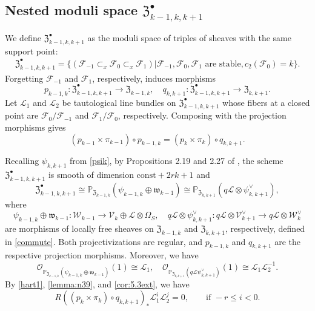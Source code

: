 \documentclass{amsart}
\numberwithin{equation}{section}
\newcommand\mc{\mathcal}
\newcommand\mf{\mathfrak}
\newcommand\mb{\mathbb}
\theoremstyle{definition}
\theoremstyle{remark}
\begin{document}
\subsection{Nested moduli space $\mf{Z}_{k-1,k,k+1}^{\bullet}$} We define $\mf{Z}_{k-1,k,k+1}^{\bullet}$ as the moduli space of triples of sheaves with the same support point:
\begin{align*}
 \mf{Z}_{k-1,k,k+1}^{\bullet}=\{(\mc{F}_{-1}\subset_{x} \mc{F}_{0}\subset_{x} \mc{F}_{1})| \mc{F}_{-1},\mc{F}_{0},\mc{F}_{1}\text{ are stable}, c_{2}(\mc{F}_{0})=k\}.
\end{align*}
Forgetting $\mc{F}_{-1}$ and $\mc{F}_{1}$, respectively, induces morphisms
$$p_{k-1,k}:\mf{Z}_{k-1,k,k+1}^{\bullet}\to \mf{Z}_{k-1,k},\quad q_{k,k+1}:\mf{Z}_{k-1,k,k+1}^{\bullet}\to \mf{Z}_{k,k+1}.$$
Let $\mathcal{L}_{1}$ and $\mathcal{L}_{2}$ be tautological line bundles on $\mf{Z}_{k-1,k,k+1}^{\bullet}$ whose fibers at a closed point are $\mathcal{F}_{0}/\mc{F}_{-1}$ and $\mathcal{F}_{1}/\mathcal{F}_{0}$, respectively. Composing with the projection morphisms gives 
\begin{equation}
  \label{hart1}
  (p_{k-1}\times \pi_{k-1})\circ p_{k-1,k}=(p_{k}\times \pi_{k})\circ q_{k,k+1}.
\end{equation}

Recalling $\psi_{k,k+1}$ from \cref{psik}, by Propositions 2.19 and 2.27 of \cite{neguct2018hecke},
 the scheme $\mf{Z}_{k-1,k,k+1}^{\bullet}$ is smooth of dimension $\mathrm{const}+2rk+1$ and
\begin{equation}
   \label{lemma:n39}
    \mf{Z}_{k-1,k,k+1}^{\bullet}\cong \mb{P}_{\mf{Z}_{k-1,k}}(\psi_{k-1,k}\oplus \mf{w}_{k-1})\cong \mb{P}_{\mf{Z}_{k,k+1}}(q\mc{L}\otimes \psi_{k,k+1}^{\vee}),
\end{equation}
where
  $$\psi_{k-1,k}\oplus \mf{w}_{k-1}:\mc{W}_{k-1}\to \mc{V}_{k}\oplus \mc{L}\otimes \Omega_{S}, \quad q\mc{L}\otimes \psi_{k,k+1}^{\vee}:q\mc{L}\otimes \mc{V}_{k+1}^{\vee}\to q\mc{L}\otimes \mc{W}_{k}^{\vee} $$
  are morphisms of locally free sheaves on $\mf{Z}_{k-1,k}$ and $\mf{Z}_{k,k+1}$, respectively, defined in \cref{commute}. Both projectivizations are regular, and $p_{k-1,k}$ and $q_{k,k+1}$ are the respective projection morphisms. Moreover, we have
    $$\mc{O}_{\mb{P}_{\mf{Z}_{k-1,k}}(\psi_{k-1,k}\oplus \mf{w}_{k-1})}(1)\cong \mc{L}_{1},\quad \mc{O}_{\mb{P}_{\mf{Z}_{k,k+1}}(q\mc{L}\psi_{k,k+1}^{\vee})}(1)\cong \mc{L}_{1}\mc{L}_{2}^{-1}.$$
By \cref{hart1}, \cref{lemma:n39}, and \cref{cor:5.3ext}, we have
  \begin{equation}
   \label{n510} R((p_{k}\times \pi_{k})\circ q_{k,k+1})_{*}\mc{L}_{1}^{i}\mc{L}_{2}^{j}=0, \qquad \text{if } -r\leq i<0.
  \end{equation}
\end{document}

